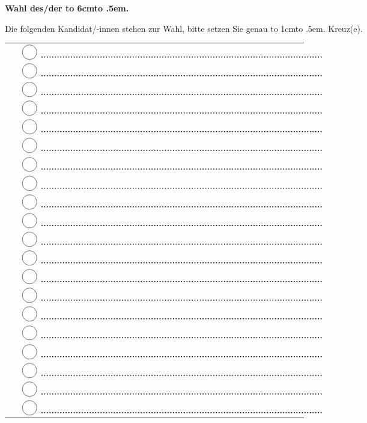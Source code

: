 \documentclass[12pt]{article}
\def\mydotfill#1{\cleaders\hbox to #1{.}\hfill}
\newcommand\dotline[2][.5em]{\leavevmode\hbox to #2{\mydotfill{#1}\hfil}}
\newcommand{\kreiswithdots}{
    $\vcenter{\begin{tikzpicture}
        \draw (0,0) circle (0.3cm);
        \draw [dotted, very thick] (0.5, -0.2) -- (12.3, -0.2);
    \end{tikzpicture}}$
}
\newcommand{\sheet}{

    \textbf{\large{Wahl des/der \dotline{6cm}}}

    Die folgenden Kandidat/-innen stehen zur Wahl, bitte setzen Sie genau \dotline{1cm} Kreuz(e).

    \begin{tabular}{l}
        \kreiswithdots \\
        \kreiswithdots \\
        \kreiswithdots \\
        \kreiswithdots \\
        \kreiswithdots \\
        \kreiswithdots \\
        \kreiswithdots \\
        \kreiswithdots \\
        \kreiswithdots \\
        \kreiswithdots \\
        \kreiswithdots \\
        \kreiswithdots \\
        \kreiswithdots \\
        \kreiswithdots \\
        \kreiswithdots \\
        \kreiswithdots \\
        \kreiswithdots \\
        \kreiswithdots \\
        \kreiswithdots \\
        \kreiswithdots \\
    \end{tabular}
}
\begin{document}
\sheet
\end{document}

